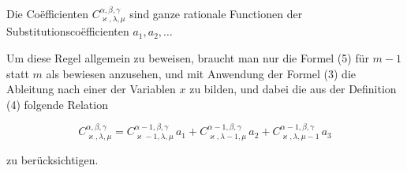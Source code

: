 Die Co\"efficienten $C^{\alpha, \beta, \gamma}_{\varkappa, \lambda, \mu}$ sind ganze rationale Functionen der Substitutionscoëfficienten $a_1, a_2, \ldots$

Um diese Regel allgemein zu beweisen, braucht man nur die Formel (5) für $m - 1$ statt $m$ als bewiesen anzusehen, und mit Anwendung der Formel (3) die Ableitung nach einer der Variablen $x$ zu bilden, und dabei die aus der Definition (4) folgende Relation

\[
C^{\alpha, \beta, \gamma}_{\varkappa, \lambda, \mu} = C^{\alpha - 1, \beta, \gamma}_{\varkappa - 1, \lambda, \mu}\, a_1 + C^{\alpha - 1, \beta, \gamma}_{\varkappa, \lambda - 1, \mu}\, a_2 + C^{\alpha - 1, \beta, \gamma}_{\varkappa, \lambda, \mu - 1}\, a_3
\]

zu berücksichtigen.
